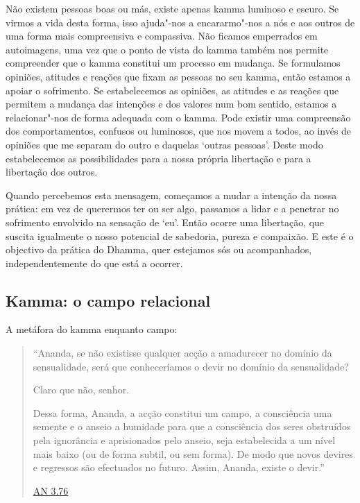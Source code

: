 Não existem pessoas boas ou más, existe apenas kamma luminoso e escuro. Se
virmos a vida desta forma, isso ajuda"-nos a encararmo"-nos a nós e aos outros
de uma forma mais compreensiva e compassiva. Não ficamos emperrados em
autoimagens, uma vez que o ponto de vista do kamma também nos permite
compreender que o kamma constitui um processo em mudança. Se formulamos
opiniões, atitudes e reações que fixam as pessoas no seu kamma, então estamos a
apoiar o sofrimento. Se estabelecemos as opiniões, as atitudes e as reações que
permitem a mudança das intenções e dos valores num bom sentido, estamos a
relacionar"-nos de forma adequada com o kamma. Pode existir uma compreensão dos
comportamentos, confusos ou luminosos, que nos movem a todos, ao invés de
opiniões que me separam do outro e daquelas `outras pessoas'. Deste modo
estabelecemos as possibilidades para a nossa própria libertação e para a
libertação dos outros.

Quando percebemos esta mensagem, começamos a mudar a intenção da nossa prática:
em vez de querermos ter ou ser algo, passamos a lidar e a penetrar no sofrimento
envolvido na sensação de `eu'. Então ocorre uma libertação, que suscita
igualmente o nosso potencial de sabedoria, pureza e compaixão. E este é o
objectivo da prática do Dhamma, quer estejamos sós ou acompanhados,
independentemente do que está a ocorrer.

\subsection{Kamma: o campo relacional}

A metáfora do kamma enquanto campo:

\begin{quote}
  ``Ananda, se não existisse qualquer acção a amadurecer no domínio da
  sensualidade, será que conheceríamos o devir no domínio da sensualidade?

  Claro que não, senhor.

  Dessa forma, Ananda, a acção constitui um campo, a consciência uma semente e o
  anseio a humidade para que a consciência dos seres obstruídos pela ignorância
  e aprisionados pelo anseio, seja estabelecida a um nível mais baixo (ou de
  forma subtil, ou sem forma). De modo que novos devires e regressos são
  efectuados no futuro. Assim, Ananda, existe o devir.''

  \href{https://suttacentral.net/an3.76/en/thanissaro}{AN 3.76}
\end{quote}

